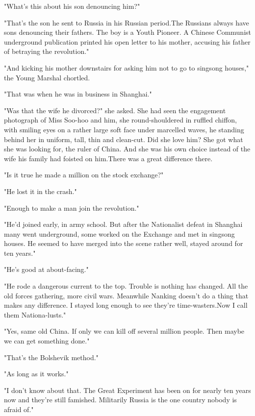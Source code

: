 \par "What's this about his son denouncing him?"
\par "That's the son he sent to Russia in his Russian period.The Russians always have sons denouncing their fathers. The boy is a Youth Pioneer. A Chinese Communist underground publication printed his open letter to his mother, accusing his father of betraying the revolution."
\par "And kicking his mother downstairs for asking him not to go to singsong houses," the Young Marshal chortled.
\par "That was when he was in business in Shanghai."
\par "Was that the wife he divorced?" she asked. She had seen the engagement photograph of Miss Soo-hoo and him, she round-shouldered in ruffled chiffon, with smiling eyes on a rather large soft face under marcelled waves, he standing behind her in uniform, tall, thin and clean-cut. Did she love him? She got what she was looking for, the ruler of China. And she was his own choice instead of the wife his family had foisted on him.There was a great difference there.
\par "Is it true he made a million on the stock exchange?"
\par "He lost it in the crash."
\par "Enough to make a man join the revolution."
\par "He'd joined early, in army school. But after the Nationalist defeat in Shanghai many went underground, some worked on the Exchange and met in singsong houses. He seemed to have merged into the scene rather well, stayed around for ten years."
\par "He's good at about-facing."
\par "He rode a dangerous current to the top. Trouble is nothing has changed. All the old forces gathering, more civil wars. Meanwhile Nanking doesn't do a thing that makes any difference. I stayed long enough to see they're time-wasters.Now I call them Nationa-lusts."
\par "Yes, same old China. If only we can kill off several million people. Then maybe we can get something done."
\par "That's the Bolshevik method."
\par "As long as it works."
\par "I don't know about that. The Great Experiment has been on for nearly ten years now and they're still famished. Militarily Russia is the one country nobody is afraid of."
